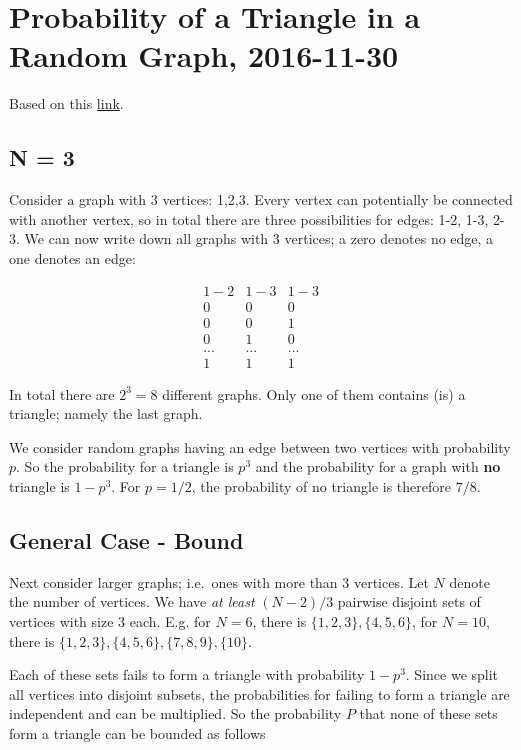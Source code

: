 \section{Probability of a Triangle in a Random Graph, 2016-11-30}
\label{2016-11-30:entry}

Based on this
\href{http://math.stackexchange.com/questions/2023681/probability-of-a-random-graph-being-triangle-free}{link}.

\subsection{N = 3}\label{n-3}

Consider a graph with 3 vertices: 1,2,3. Every vertex can potentially be
connected with another vertex, so in total there are three possibilities
for edges: 1-2, 1-3, 2-3. We can now write down all graphs with 3
vertices; a zero denotes no edge, a one denotes an edge:

\[
\begin{array}{ccc}
1-2 & 1-3 & 1-3 \\
\hline
0 & 0 & 0 \\
0 & 0 & 1 \\
0 & 1 & 0 \\
... & ... & ... \\
1 & 1 & 1
\end{array}
\]

In total there are \(2^3 = 8\) different graphs. Only one of them
contains (is) a triangle; namely the last graph.

We consider random graphs having an edge between two vertices with
probability \(p\). So the probability for a triangle is \(p^3\) and the
probability for a graph with \textbf{no} triangle is \(1-p^3\). For
\(p=1/2\), the probability of no triangle is therefore \(7/8\).

\subsection{General Case - Bound}\label{general-case---bound}

Next consider larger graphs; i.e.~ones with more than 3 vertices. Let
\(N\) denote the number of vertices. We have \emph{at least} \((N-2)/3\)
pairwise disjoint sets of vertices with size 3 each. E.g. for \(N = 6\),
there is \(\{1,2,3\},\{4,5,6\}\), for \(N = 10\), there is
\(\{1,2,3\},\{4,5,6\},\{7,8,9\},\{10\}\).

Each of these sets fails to form a triangle with probability \(1-p^3\).
Since we split all vertices into disjoint subsets, the probabilities for
failing to form a triangle are independent and can be multiplied. So the
probability \(P\) that none of these sets form a triangle can be bounded
as follows

